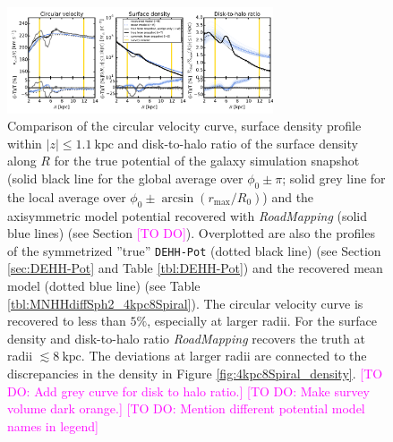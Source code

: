 \documentclass[iop,revtex4,numberedappendix,appendixfloats]{emulateapj}
\newcommand{\RM}{{\sl RoadMapping}}
\newcommand{\Wilma}[1]{\textcolor{Magenta}{#1}}
\begin{document}
\begin{figure}[!htbp]
\centering
\includegraphics[width=0.7\textwidth]{fig/MNdHHdiffSph2_4kpc8Spiral_a_test1_vcirc_surfdens_overview.pdf}
\caption{Comparison of the circular velocity curve, surface density profile within $|z|\leq1.1~\text{kpc}$ and disk-to-halo ratio of the surface density along $R$ for the true potential of the galaxy simulation snapshot (solid black line for the global average over $\phi_0\pm\pi$; solid grey line for the local average over $\phi_0\pm \arcsin(r_\text{max}/R_0)$) and the axisymmetric model potential recovered with \RM{} (solid blue lines) (see Section \Wilma{[TO DO]}). Overplotted are also the profiles of the symmetrized ''true'' \texttt{DEHH-Pot} (dotted black line) (see Section \ref{sec:DEHH-Pot} and Table \ref{tbl:DEHH-Pot}) and the recovered mean model (dotted blue line) (see Table \ref{tbl:MNHHdiffSph2_4kpc8Spiral}). The circular velocity curve is recovered to less than $5\%$, especially at larger radii. For the surface density and disk-to-halo ratio \RM{} recovers the truth at radii $\lesssim 8~\text{kpc}$. The deviations at larger radii are connected to the discrepancies in the density in Figure \ref{fig:4kpc8Spiral_density}. \Wilma{[TO DO: Add grey curve for disk to halo ratio.]} \Wilma{[TO DO: Make survey volume dark orange.]} \Wilma{[TO DO: Mention different potential model names in legend]}}
\label{fig:4kpc8Spiral_vcirc_surfdens}
\end{figure}
\end{document}
